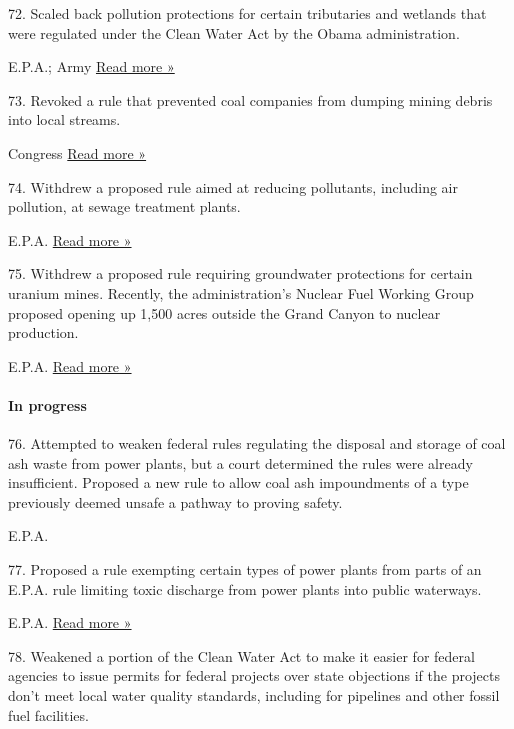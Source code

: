 72. Scaled back pollution protections for certain tributaries and
wetlands that were regulated under the Clean Water Act by the Obama
administration.

 E.P.A.; Army \textbar{}
\href{https://www.nytimes3xbfgragh.onion/2019/09/12/climate/trump-administration-to-finalize-rollback-of-clean-water-protections.html}{Read
more »}

73. Revoked a rule that prevented coal companies from dumping mining
debris into local streams.

 Congress \textbar{}
\href{https://www.nytimes3xbfgragh.onion/2017/02/02/business/energy-environment/senate-coal-regulations.html}{Read
more »}

74. Withdrew a proposed rule aimed at reducing pollutants, including air
pollution, at sewage treatment plants.

 E.P.A. \textbar{}
\href{https://www.govinfo.gov/content/pkg/FR-2017-10-26/pdf/2017-23067.pdf}{Read
more »}

75. Withdrew a proposed rule requiring groundwater protections for
certain uranium mines. Recently, the administration's Nuclear Fuel
Working Group proposed opening up 1,500 acres outside the Grand Canyon
to nuclear production.

 E.P.A. \textbar{}
\href{https://www.nytimes3xbfgragh.onion/2018/01/13/climate/trump-uranium-bears-ears.html}{Read
more »}

\hypertarget{in-progress-4}{%
\paragraph{In progress}\label{in-progress-4}}

76. Attempted to weaken federal rules regulating the disposal and
storage of coal ash waste from power plants, but a court determined the
rules were already insufficient. Proposed a new rule to allow coal ash
impoundments of a type previously deemed unsafe a pathway to proving
safety.

 E.P.A.

77. Proposed a rule exempting certain types of power plants from parts
of an E.P.A. rule limiting toxic discharge from power plants into public
waterways.

 E.P.A. \textbar{}
\href{https://www.washingtonpost.com/news/energy-environment/wp/2017/04/13/trump-administration-halts-obama-era-rule-aimed-at-curbing-toxic-wastewater-from-coal-plants/?utm_term=.e69ccd855117}{Read
more »}

78. Weakened a portion of the Clean Water Act to make it easier for
federal agencies to issue permits for federal projects over state
objections if the projects don't meet local water quality standards,
including for pipelines and other fossil fuel facilities.

